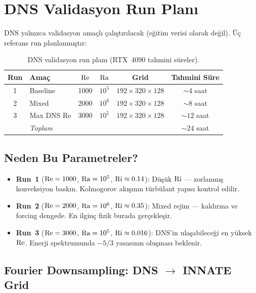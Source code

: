 \section{DNS Validasyon Run Planı}
\label{sec:dns_plan}

DNS yalnızca validasyon amaçlı çalıştırılacak (eğitim verisi olarak değil). Üç referans run planlanmıştır:

\begin{table}[H]
\centering
\caption{DNS validasyon run planı (RTX~4090 tahmini süreler).}
\label{tab:dns_runs}
\begin{tabular}{clcccc}
\toprule
\textbf{Run} & \textbf{Amaç} & $\mathrm{Re}$ & $\mathrm{Ra}$ & \textbf{Grid} & \textbf{Tahmini Süre} \\
\midrule
1 & Baseline   & 1000 & $10^5$ & $192 \times 320 \times 128$ & $\sim 4$ saat \\
2 & Mixed      & 2000 & $10^6$ & $192 \times 320 \times 128$ & $\sim 8$ saat \\
3 & Max DNS Re & 3000 & $10^5$ & $192 \times 320 \times 128$ & $\sim 12$ saat \\
\midrule
  & \multicolumn{4}{l}{\textit{Toplam}}          & $\sim 24$ saat \\
\bottomrule
\end{tabular}
\end{table}

\subsection{Neden Bu Parametreler?}

\begin{itemize}
    \item \textbf{Run~1} ($\mathrm{Re}=1000$, $\mathrm{Ra}=10^5$, $\mathrm{Ri} \approx 0.14$): Düşük $\mathrm{Ri}$ --- zorlanmış konveksiyon baskın. Kolmogorov akışının türbülant yapısı kontrol edilir.
    \item \textbf{Run~2} ($\mathrm{Re}=2000$, $\mathrm{Ra}=10^6$, $\mathrm{Ri} \approx 0.35$): Mixed rejim --- kaldırma ve forcing dengede. En ilginç fizik burada gerçekleşir.
    \item \textbf{Run~3} ($\mathrm{Re}=3000$, $\mathrm{Ra}=10^5$, $\mathrm{Ri} \approx 0.016$): DNS'in ulaşabileceği en yüksek $\mathrm{Re}$. Enerji spektrumunda $-5/3$ yasasının oluşması beklenir.
\end{itemize}

\subsection{Fourier Downsampling: DNS $\to$ INNATE Grid}


